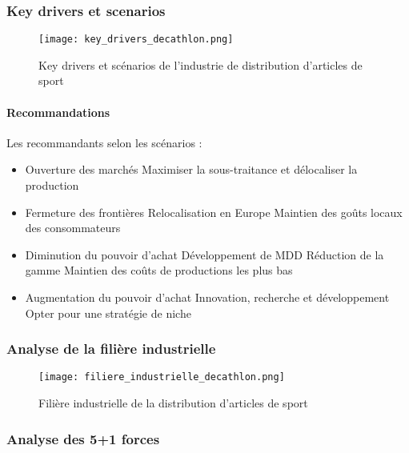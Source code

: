     \subsubsection{Key drivers et scenarios}
    
    \begin{figure}[H]
      \centering
	\texttt{[image: key\_drivers\_decathlon.png]}
	\caption{Key drivers et scénarios de l'industrie de distribution d'articles de sport}
    \end{figure}
    
    \paragraph{Recommandations} Les recommandants selon les scénarios :
    
    \begin{itemize}
     \item Ouverture des marchés
      \subitem Maximiser la sous-traitance et délocaliser la production
     \item Fermeture des frontières
      \subitem Relocalisation en Europe
      \subitem Maintien des goûts locaux des consommateurs
     \item Diminution du pouvoir d'achat
      \subitem Développement de MDD
      \subitem Réduction de la gamme
      \subitem Maintien des coûts de productions les plus bas
     \item Augmentation du pouvoir d'achat
      \subitem Innovation, recherche et développement
      \subitem Opter pour une stratégie de niche
    \end{itemize}
    
    \subsubsection{Analyse de la filière industrielle}
    
    \begin{figure}[H]
      \begin{center}
	\texttt{[image: filiere\_industrielle\_decathlon.png]}
	\caption{Filière industrielle de la distribution d'articles de sport}
      \end{center}
    \end{figure}
    
    \clearpage
    
    \subsubsection{Analyse des 5+1 forces}
    
